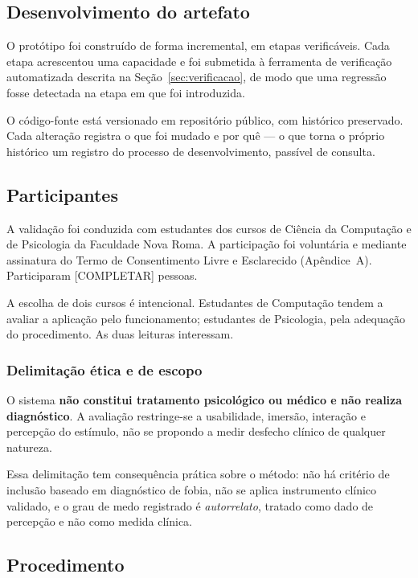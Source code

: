 \subsection{Desenvolvimento do artefato}

O protótipo foi construído de forma incremental, em etapas verificáveis.
Cada etapa acrescentou uma capacidade e foi submetida à ferramenta de
verificação automatizada descrita na Seção~\ref{sec:verificacao}, de modo
que uma regressão fosse detectada na etapa em que foi introduzida.

O código-fonte está versionado em repositório público, com histórico
preservado. Cada alteração registra o que foi mudado e por quê --- o que
torna o próprio histórico um registro do processo de desenvolvimento,
passível de consulta.

\subsection{Participantes}

A validação foi conduzida com estudantes dos cursos de Ciência da
Computação e de Psicologia da Faculdade Nova Roma. A participação foi
voluntária e mediante assinatura do Termo de Consentimento Livre e
Esclarecido (Apêndice~A). Participaram [COMPLETAR] pessoas.

A escolha de dois cursos é intencional. Estudantes de Computação tendem a
avaliar a aplicação pelo funcionamento; estudantes de Psicologia, pela
adequação do procedimento. As duas leituras interessam.

\subsubsection{Delimitação ética e de escopo}

O sistema \textbf{não constitui tratamento psicológico ou médico e não
realiza diagnóstico}. A avaliação restringe-se a usabilidade, imersão,
interação e percepção do estímulo, não se propondo a medir desfecho
clínico de qualquer natureza.

Essa delimitação tem consequência prática sobre o método: não há critério
de inclusão baseado em diagnóstico de fobia, não se aplica instrumento
clínico validado, e o grau de medo registrado é \emph{autorrelato},
tratado como dado de percepção e não como medida clínica.

\subsection{Procedimento}

